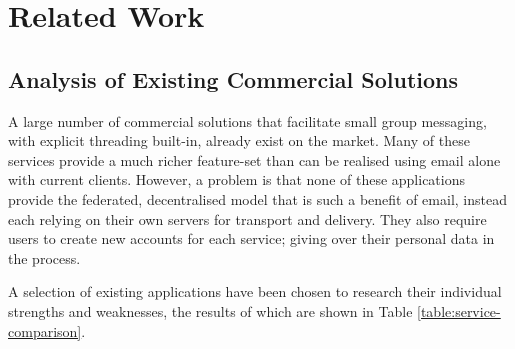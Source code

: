 \chapter{Related Work}


\section{Analysis of Existing Commercial Solutions}

A large number of commercial solutions that facilitate small group messaging, with explicit threading built-in, already exist on the market. Many of these services provide a much richer feature-set than can be realised using email alone with current clients. However, a problem is that none of these applications provide the federated, decentralised model that is such a benefit of email, instead each relying on their own servers for transport and delivery. They also require users to create new accounts for each service; giving over their personal data in the process.

A selection of existing applications have been chosen to research their individual strengths and weaknesses, the results of which are shown in Table \ref{table:service-comparison}.

\begin{table}[h]
  \def\arraystretch{1.5}
  \centering
  \caption{Feature comparison of existing commercial messaging applications}
  \label{table:service-comparison}
\end{table}

